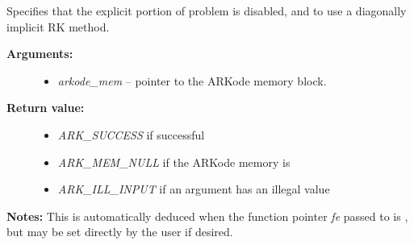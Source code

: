 \documentclass[letterpaper,10pt,english]{sphinxmanual}
\begin{document}
\begin{fulllineitems}
\label{c_interface/User_callable:c.ARKodeSetImplicit}
Specifies that the explicit portion of problem is disabled,
and to use a diagonally implicit RK method.
\begin{description}
\item[{\textbf{Arguments:}}] \leavevmode\begin{itemize}
\item {} 
\emph{arkode\_mem} -- pointer to the ARKode memory block.

\end{itemize}

\item[{\textbf{Return value:}}] \leavevmode\begin{itemize}
\item {} 
\emph{ARK\_SUCCESS} if successful

\item {} 
\emph{ARK\_MEM\_NULL} if the ARKode memory is 

\item {} 
\emph{ARK\_ILL\_INPUT} if an argument has an illegal value

\end{itemize}

\end{description}

\textbf{Notes:} This is automatically deduced when the function pointer \emph{fe}
passed to {\hyperref[c_interface/User_callable:c.ARKodeInit]{\emph{}}} is , but may be set directly by the
user if desired.

\end{fulllineitems}

\end{document}

